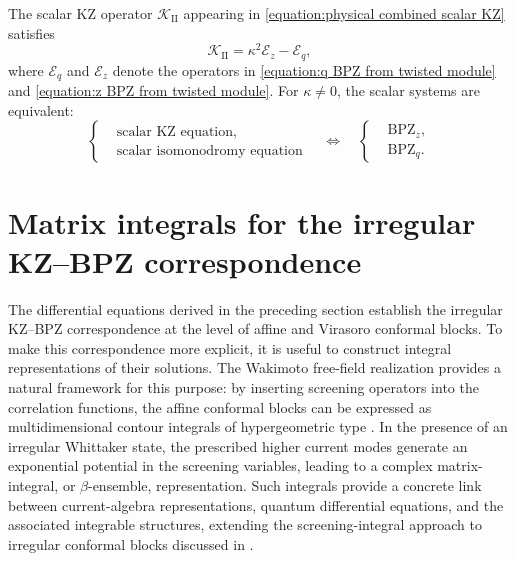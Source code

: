 \documentclass[a4paper,11pt]{article}
\numberwithin{equation}{section}
\begin{document}
The scalar KZ operator $\mathcal{K}_{\mathrm{II}}$ appearing in
\eqref{equation:physical combined scalar KZ} satisfies
\begin{equation}
\mathcal{K}_{\mathrm{II}}
	=
	\kappa^{2}\mathcal{E}_{z}-\mathcal{E}_{q},
\end{equation}
where $\mathcal{E}_{q}$ and $\mathcal{E}_{z}$ denote the operators in
\eqref{equation:q BPZ from twisted module} and
\eqref{equation:z BPZ from twisted module}.  For $\kappa\neq0$,
the scalar systems are equivalent:
\begin{equation}
	\left\{
	\begin{aligned}
		&\text{scalar KZ equation},\\
		&\text{scalar isomonodromy equation}
	\end{aligned}
	\right.
	\quad\Longleftrightarrow\quad
	\left\{
	\begin{aligned}
		&\mathrm{BPZ}_{z},\\
		&\mathrm{BPZ}_{q}.
	\end{aligned}
	\right.
\end{equation}


\section{Matrix integrals for the irregular KZ--BPZ correspondence}
\label{section:PII integral solutions}

The differential equations derived in the preceding section establish the irregular KZ–BPZ correspondence at the level of affine and Virasoro conformal blocks. To make this correspondence more explicit, it is useful to construct integral representations of their solutions. The Wakimoto free-field realization provides a natural framework for this purpose: by inserting screening operators into the correlation functions, the affine conformal blocks can be expressed as multidimensional contour integrals of hypergeometric type \cite{SchechtmanVarchenko1990,Kohno2014}. In the presence of an irregular Whittaker state, the prescribed higher current modes generate an exponential potential in the screening variables, leading to a complex matrix-integral, or $\beta$-ensemble, representation. Such integrals provide a concrete link between current-algebra representations, quantum differential equations, and the associated integrable structures, extending the screening-integral approach to irregular conformal blocks discussed in \cite{Rumanov2014,HaghighatLiuReshetikhin2023,GukovHaghighatLiuReshetikhin2024,Haghighat2025}.
\end{document}
